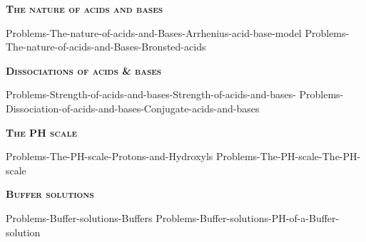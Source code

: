 \documentclass[main.tex]{subfiles}
\newcommand\chapterlabel{Ch-acidbase}
\begin{document}
\newpage
 
\fancyhfoffset[E,O]{0pt}
\setlength{\columnsep}{30pt}
\begin{conclusion}
\end{conclusion}
\begin{multicols*}{2}\setcounter{numA}{1}
{\raggedright\textsc{\textbf{The nature of acids and bases}}\par}
 {Problems-The-nature-of-acids-and-Bases-Arrhenius-acid-base-model}
 {Problems-The-nature-of-acids-and-Bases-Bronsted-acids}

{\raggedright\textsc{\textbf{Dissociations of acids \& bases}}\par}
 {Problems-Strength-of-acids-and-bases-Strength-of-acids-and-bases-}
 {Problems-Dissociation-of-acids-and-bases-Conjugate-acids-and-bases}
 
{\raggedright\textsc{\textbf{The PH scale}}\par}
 {Problems-The-PH-scale-Protons-and-Hydroxyls}
 {Problems-The-PH-scale-The-PH-scale}
			


{\raggedright\textsc{\textbf{Buffer solutions}}\par}
 {Problems-Buffer-solutions-Buffers}
 {Problems-Buffer-solutions-PH-of-a-Buffer-solution}


\end{multicols*}
\end{document}
